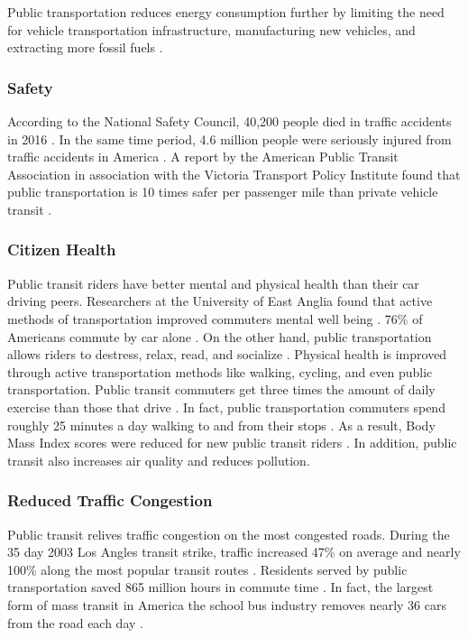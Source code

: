 \documentclass[sigconf]{acmart}
\begin{document}
Public transportation reduces energy consumption further by limiting the need for vehicle transportation infrastructure, manufacturing new vehicles, and extracting more fossil fuels \cite{FTA01}. 

\subsubsection{Safety} According to the National Safety Council, 40,200 people died in traffic accidents in 2016 \cite{Boudette01}. In the same time period, 4.6 million people were seriously injured from traffic accidents in America \cite{Korosec01}. A report by the American Public Transit Association in association with the Victoria Transport Policy Institute found that public transportation is 10 times safer per passenger mile than private vehicle transit \cite{Mackie01}. 

\subsubsection{Citizen Health} Public transit riders have better mental and physical health than their car driving peers. Researchers at the University of East Anglia found that active methods of transportation improved commuters mental well being \cite{Martin01}. 76\% of Americans commute by car alone \cite{Clara01}. On the other hand, public transportation allows riders to destress, relax, read, and socialize \cite{Martin01}. Physical health is improved through active transportation methods like walking, cycling, and even public transportation. Public transit commuters get three times the amount of daily exercise than those that drive \cite{Litman01}. In fact, public transportation commuters spend roughly 25 minutes a day walking to and from their stops \cite{Margolis01}. As a result, Body Mass Index scores were reduced for new public transit riders \cite{Brown01} \cite{MacDonald01}. In addition, public transit also increases air quality and reduces pollution. 

\subsubsection{Reduced Traffic Congestion} Public transit relives traffic congestion on the most congested roads. During the 35 day 2003 Los Angles transit strike, traffic increased 47\% on average and nearly 100\% along the most popular transit routes \cite{Anderson01}. Residents served by public transportation saved 865 million hours in commute time \cite{Brown02}. In fact, the largest form of mass transit in America the school bus industry removes nearly 36 cars from the road each day \cite{ASCBC}.
\end{document}
